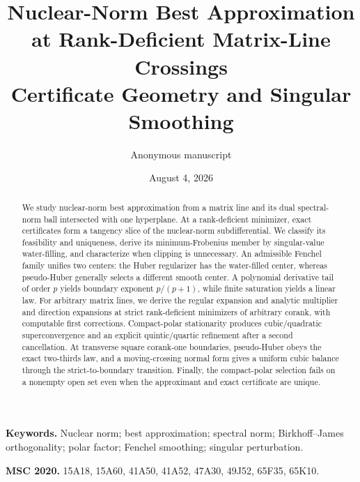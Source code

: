 \documentclass[10pt]{article}
\title{\textbf{Nuclear-Norm Best Approximation at Rank-Deficient Matrix-Line Crossings}\\
\large Certificate Geometry and Singular Smoothing}
\author{Anonymous manuscript}
\date{August 4, 2026}
\begin{document}
\maketitle

\begin{abstract}
We study nuclear-norm best approximation from a matrix line and its dual
spectral-norm ball intersected with one hyperplane.  At a rank-deficient
minimizer, exact certificates form a tangency slice of the nuclear-norm
subdifferential.  We classify its feasibility and uniqueness, derive its
minimum-Frobenius member by singular-value water-filling, and characterize
when clipping is unnecessary.  An admissible Fenchel family unifies two
centers: the Huber regularizer has the water-filled center, whereas
pseudo-Huber generally selects a different smooth center.  A polynomial
derivative tail of order \(p\) yields boundary exponent \(p/(p+1)\), while
finite saturation yields a linear law.  For arbitrary matrix lines, we derive
the regular expansion and analytic multiplier and direction expansions at
strict rank-deficient minimizers of arbitrary corank, with computable first
corrections.  Compact-polar stationarity produces cubic/quadratic
superconvergence and an explicit quintic/quartic refinement after a second
cancellation.  At transverse square corank-one boundaries, pseudo-Huber obeys
the exact two-thirds law, and a moving-crossing normal form gives a uniform
cubic balance through the strict-to-boundary transition.  Finally, the
compact-polar selection fails on a nonempty open set even when the approximant
and exact certificate are unique.
\end{abstract}

\noindent\textbf{Keywords.}
Nuclear norm; best approximation; spectral norm; Birkhoff--James
orthogonality; polar factor; Fenchel smoothing; singular perturbation.

\noindent\textbf{MSC 2020.}
15A18, 15A60, 41A50, 41A52, 47A30, 49J52, 65F35, 65K10.









{\footnotesize
\setlength{\parskip}{0pt}
\setlength{\bibsep}{0pt plus 0.2ex}


}
\end{document}
